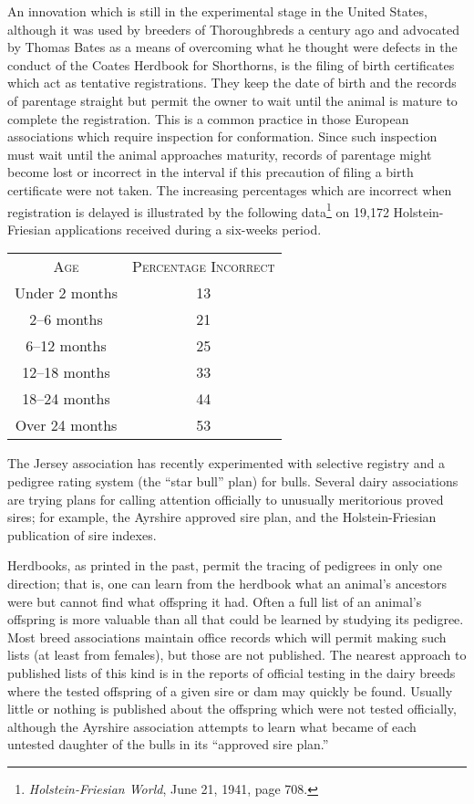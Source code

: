 An innovation which is still in the experimental stage in the United States, although it was used by breeders of Thoroughbreds a century ago and advocated by Thomas Bates as a means of overcoming what he thought were defects in the conduct of the Coates Herdbook for Shorthorns, is the filing of  birth certificates which act as tentative registrations. They keep the date of birth and the records of parentage straight but permit the owner to wait until the animal is mature to complete the registration. This is a common practice in those European associations which require inspection for conformation. Since such inspection must wait until the animal approaches maturity, records of parentage might become lost or incorrect in the interval if this precaution of filing a birth certificate were not taken. The increasing percentages which are incorrect when registration is delayed is illustrated by the following data\footnote{\textit{Holstein-Friesian World}, June 21, 1941, page 708.} on 19,172 Holstein-Friesian applications received during a six-weeks period.

\begin{table}[htbp]
	\centering
	\begin{tabular}{cc}
		\textsc{Age} & \textsc{Percentage Incorrect} \\
		Under 2 months  & 13 \\
		2--6 months & 21 \\
		6--12 months & 25 \\
		12--18 months & 33 \\
		18--24 months & 44 \\
		Over 24 months & 53 \\
	\end{tabular}
\end{table}

The Jersey association has recently experimented with selective registry and a pedigree rating system
(the ``star bull'' plan) for bulls. Several dairy associations are trying plans for calling attention officially
to unusually meritorious proved sires; for example, the Ayrshire approved sire plan, and the Holstein-Friesian
publication of sire indexes.

Herdbooks, as printed in the past, permit the tracing of pedigrees in only one direction; that is, one can learn from the 
herdbook what an animal's ancestors were but cannot find what offspring it had. Often a full list of an animal's offspring 
is more valuable than all that could be learned by studying its pedigree. Most breed associations maintain office records 
which will permit making such lists (at least from females), but those are not published. The nearest approach to published
lists of this kind is in the reports of official testing in the dairy breeds where the tested offspring of a given sire or 
dam may quickly be found. Usually little or nothing is published about the offspring which were not tested officially, 
although the Ayrshire association attempts to learn what became of each untested daughter of the bulls in its ``approved 
sire plan.''

